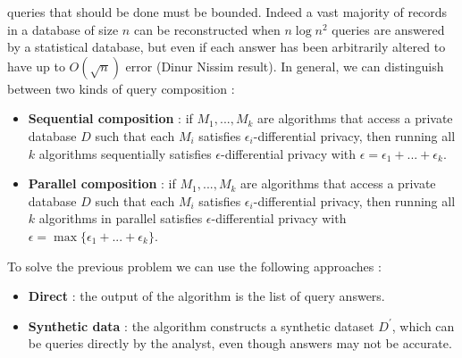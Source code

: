 queries that should be done must be bounded. Indeed a vast majority of records in a database of size $n$ can be reconstructed when $n \log n^{2}$ queries are answered by a statistical database, but even if each answer has been arbitrarily altered to have up to $O(\sqrt{n})$ error (Dinur Nissim result). In general, we can distinguish between two kinds of query composition :
\begin{itemize}
\item \textbf{Sequential composition} : if $M_{1}, ..., M_{k}$ are algorithms that access a private database $D$ such that each $M_{i}$ satisfies $\epsilon_{i}$-differential privacy, then running all $k$ algorithms sequentially satisfies $\epsilon$-differential privacy with $\epsilon = \epsilon_{1} + ... + \epsilon_{k}$.
\item \textbf{Parallel composition} : if $M_{1}, ..., M_{k}$ are algorithms that access a private database $D$ such that each $M_{i}$ satisfies $\epsilon_{i}$-differential privacy, then running all $k$ algorithms in parallel satisfies $\epsilon$-differential privacy with $\epsilon = \max \{\epsilon_{1} + ... + \epsilon_{k}\}$.
\end{itemize}
To solve the previous problem we can use the following approaches :
\begin{itemize}
\item \textbf{Direct} : the output of the algorithm is the list of query answers.
\item \textbf{Synthetic data} : the algorithm constructs a synthetic dataset $D^{'}$, which can be queries directly by the analyst, even though answers may not be accurate.
\end{itemize}

